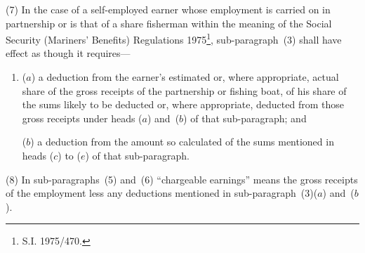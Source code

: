 \documentclass[12pt,a4paper]{article}
\begin{document}
%

(7) In the case of a self-employed earner whose employment is carried on in partnership or is that of a share fisherman within the meaning of the Social Security (Mariners' Benefits) Regulations 1975\footnote{\frenchspacing S.I. 1975/470.}, sub-paragraph~(3) shall have effect as though it requires—
\begin{enumerate}\item[]
($a$) a deduction from the earner’s estimated or, where appropriate, actual share of the gross receipts of the partnership or fishing boat, of his share of the sums likely to be deducted or, where appropriate, deducted from those gross receipts under heads ($a$) and~($b$) of that sub-paragraph; and

($b$) a deduction from the amount so calculated of the sums mentioned in heads ($c$) to ($e$) of that sub-paragraph.
\end{enumerate}

(8) In sub-paragraphs~(5) and~(6) “chargeable earnings” means the gross receipts of the employment less any deductions mentioned in sub-paragraph~(3)($a$) and~($b$).
\end{document}

